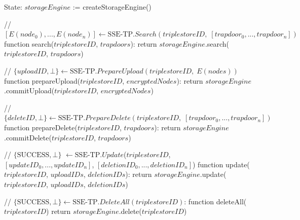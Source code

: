 State:
    $storageEngine$ := createStorageEngine()

// $[E(node_0), ..., E(node_n)] \leftarrow \textrm{SSE-TP}.Search(triplestoreID, \; [trapdoor_0, ..., trapdoor_n])$ 
function search($triplestoreID$, $trapdoors$):
    return $storageEngine$.search($triplestoreID$, $trapdoors$)

// $\{uploadID, \bot\} \leftarrow \textrm{SSE-TP}.PrepareUpload(triplestoreID, \; E(nodes))$
function prepareUpload($triplestoreID$, $encryptedNodes$):
    return $storageEngine$.commitUpload($triplestoreID$, $encryptedNodes$)

// $\{deleteID, \bot\} \leftarrow \textrm{SSE-TP}.PrepareDelete(triplestoreID, \; [trapdoor_0, ..., trapdoor_n])$
function prepareDelete($triplestoreID$, $trapdoors$):
    return $storageEngine$.commitDelete($triplestoreID$, $trapdoors$)

// $\{\textrm{SUCCESS}, \bot\}$ $\leftarrow \textrm{SSE-TP}.Update$($triplestoreID$, $[updateID_0,...,updateID_n]$, $[deletionID_0, ..., deletionID_n]$) 
function update($triplestoreID$, $uploadIDs$, $deletionIDs$):
    return $storageEngine$.update($triplestoreID$, $uploadIDs$, $deletionIDs$)

// $\{\textrm{SUCCESS}, \bot\} \leftarrow \textrm{SSE-TP}.DeleteAll(triplestoreID)$:    
function deleteAll($triplestoreID$)
    return $storageEngine$.delete($triplestoreID$)